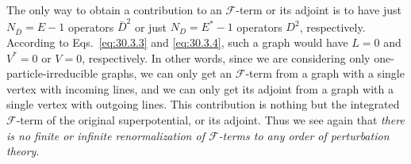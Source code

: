 The only way to obtain a contribution to an \(\mathcal{F}\)-term or its
adjoint is to have just \(N_{\bar D}=E-1\) operators \(\bar D^2\) or just
\(N_D=E^*-1\) operators \(D^2\), respectively. According to
Eqs.~\eqref{eq:30.3.3} and \eqref{eq:30.3.4}, such a graph would have \(L=0\)
and \(V^*=0\) or \(V=0\), respectively. In other words, since we are
considering only one-particle-irreducible graphs, we can only get an
\(\mathcal{F}\)-term from a graph with a single vertex with incoming lines,
and we can only get its adjoint from a graph with a single vertex with
outgoing lines. This contribution is nothing but the integrated
\(\mathcal{F}\)-term of the original superpotential, or its adjoint. Thus we
see again that \emph{there is no finite or infinite renormalization of
\(\mathcal{F}\)-terms to any order of perturbation theory}.
